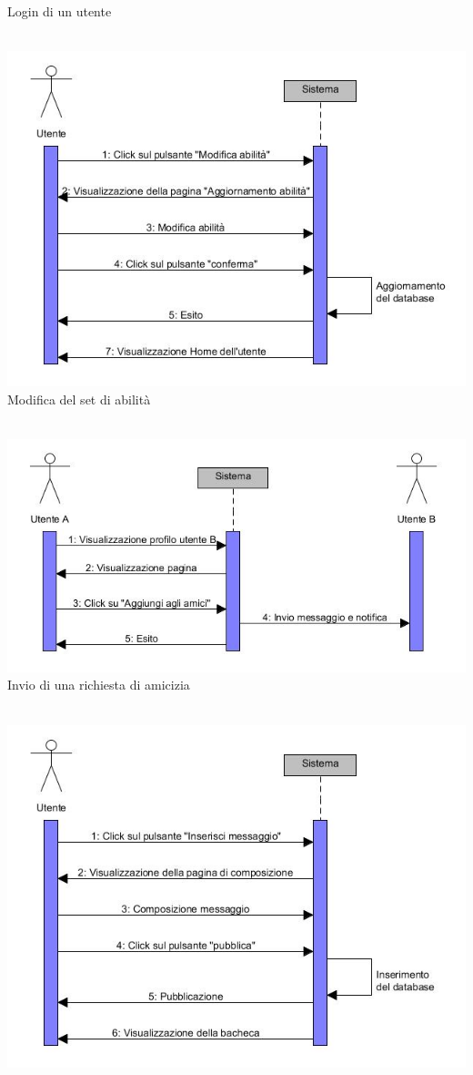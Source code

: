 \documentclass[a4paper,12pt]{article}
\begin{document}
\begin{center}
\caption{Login di un utente} \\
\vspace*{\fill}
\includegraphics[scale=0.75]{sDiagrams/modificaAbilita.jpg} \\
\caption{Modifica del set di abilità} \\
\clearpage
\includegraphics[scale=0.75]{sDiagrams/richiestaAmicizia.jpg} \\
\caption{Invio di una richiesta di amicizia} \\
\vspace*{\fill}
\includegraphics[scale=0.75]{sDiagrams/creazioneThread.jpg} \\

\end{center}
\end{document}

